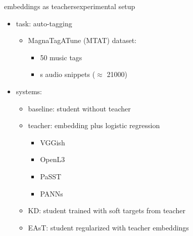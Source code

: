 \begin{frame}{embeddings as teachers}{experimental setup}
            \begin{itemize}
                \item   task: auto-tagging
                    \begin{itemize}
                       \item   MagnaTagATune (MTAT) dataset:
													\begin{itemize}
															\item   50 music tags
															\item   \unit[30]{s} audio snippets ($\approx$ 21000)
													\end{itemize}
                    \end{itemize}
                \bigskip
                \item   systems:
                    \begin{itemize}
                        \item   baseline: student without teacher
                        \item   teacher: embedding plus logistic regression
														\begin{itemize}
															\item VGGish
															\item OpenL3
															\item PaSST
															\item PANNs
														\end{itemize}
												\item		KD: student trained with soft targets from teacher
												\item		EAsT: student regularized with teacher embeddings
                    \end{itemize}
            \end{itemize}
\end{frame}

